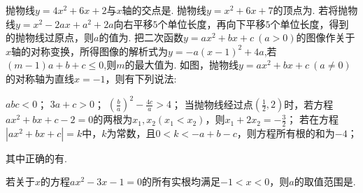 \documentclass[10pt]{article}
\begin{document}
\begin{questions}{\complitingintroduction}
    \question 抛物线$y = 4x^{2} + 6x + 2$与$x$轴的交点是\complitingline.
    \question 抛物线$y = x^{2} + 6x + 7$的顶点为\complitingline.
    \question 若将抛物线$y=x^2-2ax+a^2+2a$向右平移$5$个单位长度，再向下平移$5$个单位长度，得到的抛物线过原点，则$a$的值为\complitingline.
    \question 把二次函数$y = ax^{2} + bx + c \ (a > 0)$的图像作关于$x$轴的对称变换，所得图像的解析式为$y = - a(x - 1)^{2} + 4a$,若$(m - 1)a + b + c \leq 0$,则$m$的最大值为\complitingline.
    \question 如图，抛物线$y = ax^{2} + bx + c \ (a \neq 0)$的对称轴为直线$x = - 1$，则有下列说法:
    \begin{subsubquestions}
        \subsubquestion $abc < 0$；
        \subsubquestion $3a + c > 0$；
        \subsubquestion $\left( \frac{b}{a} \right)^{2} - \frac{4c}{a} > 4$；
        \subsubquestion 当抛物线经过点$\left( \frac{1}{2},2 \right)$时，若方程$ax^{2} + bx + c - 2 = 0$的两根为$x_{1},x_{2}\left( x_{1} < x_{2} \right)$，则$x_{1} + 2x_{2} = - \frac{3}{2}$；
        \subsubquestion 若在方程$\left| ax^{2} + bx + c \right| = k$中，$k$为常数，且$0 < k < - a + b - c$，则方程所有根的和为$- 4$；
    \end{subsubquestions}
    其中正确的有\complitingline.
    \begin{figure}[!htb]
        \centering
        \raggedleft
    \end{figure}
    \question 若关于$x$的方程$ax^2-3x-1=0$的所有实根均满足$-1<x<0$，则$a$的取值范围是\complitingline.
\end{questions}
\end{document}
